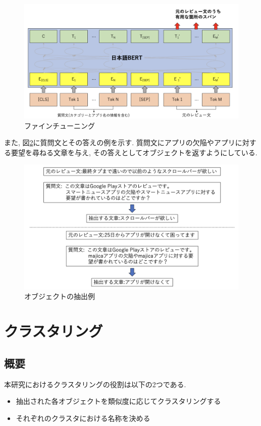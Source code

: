 \begin{figure}[hbtp]
  \centering
  \includegraphics[scale=0.3]
       {contents/images/fine-tuning.png}
  \caption{ファインチューニング\label{fig:fine-tuning}}
\end{figure}

また, 図\ref{fig:answer}に質問文とその答えの例を示す. 質問文にアプリの欠陥やアプリに対する要望を尋ねる文章を与え, その答えとしてオブジェクトを返すようにしている. 

\begin{figure}[hbtp]
  \centering
  \includegraphics[scale=0.4]
       {contents/images/answer.png}
  \caption{オブジェクトの抽出例\label{fig:answer}}
\end{figure}


\section{クラスタリング}
\subsection{概要}
本研究におけるクラスタリングの役割は以下の2つである. 
\begin{itemize}
  \item 抽出された各オブジェクトを類似度に応じてクラスタリングする
  \item それぞれのクラスタにおける名称を決める
\end{itemize}

